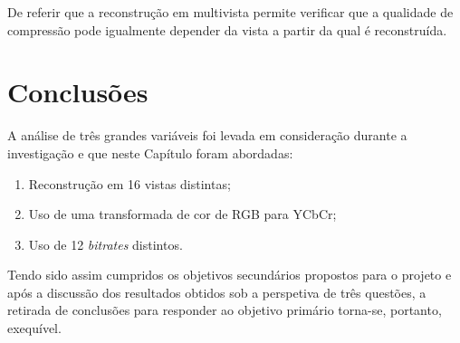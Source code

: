De referir que a reconstrução em multivista permite verificar que a qualidade de compressão pode igualmente depender da vista a partir da qual é reconstruída.

\section{Conclusões}
\label{sec::test-result:conclusao}

A análise de três grandes variáveis foi levada em consideração durante a investigação e que neste Capítulo foram abordadas:
\begin{enumerate}
    \item Reconstrução em 16 vistas distintas;
    \item Uso de uma transformada de cor de \ac{RGB} para YCbCr;
    \item Uso de 12 \textit{bitrates} distintos.
\end{enumerate}

Tendo sido assim cumpridos os objetivos secundários propostos para o projeto e após a discussão dos resultados obtidos sob a perspetiva de três questões, a retirada de conclusões para responder ao objetivo primário torna-se, portanto, exequível.
